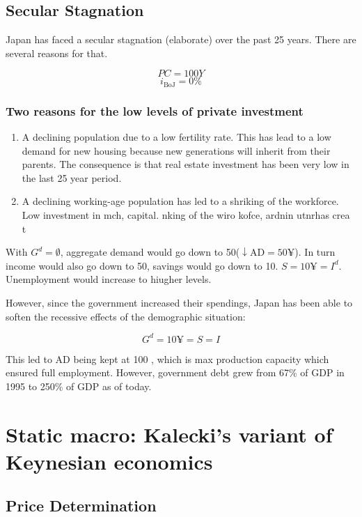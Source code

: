 \documentclass{report}
\begin{document}
\section{Secular Stagnation}
Japan has faced a secular stagnation (elaborate) over the past 25 years. There are several reasons for that. 

$$PC = 100 Y$$
$$i_{\text{BoJ}} = 0\%$$

\subsection*{Two reasons for the low levels of private investment}

\begin{enumerate}
    \item A declining population due to a low fertility rate. This has lead to a low demand for new housing because new generations will inherit from their parents. The consequence is that real estate investment has been very low in the last 25 year period. 
    \item A declining working-age population has led to a shriking of the workforce. Low investment in mch, capital. 
nking of the wiro kofce, ardnin  utnrhas crea t\end{enumerate}


With $G^d = \emptyset$, aggregate demand would go down to 50\yen ($\downarrow \text{AD} = 50 \yen$). In turn income would also go down to 50\yen, savings would go down to 10. $S = 10 \yen = I^d$. Unemployment would increase to hiugher levels. 

However, since the government increased their spendings, Japan has been able to soften the recessive effects of the demographic situation:

$$G^d = 10 \yen = S = I$$

This led to AD being kept at 100 \yen, which is max production capacity which ensured full employment. However, government debt grew from 67\% of GDP in 1995 to 250\% of GDP as of today.


\chapter{Static macro: Kalecki’s variant of Keynesian economics}

\section{Price Determination}
\end{document}
